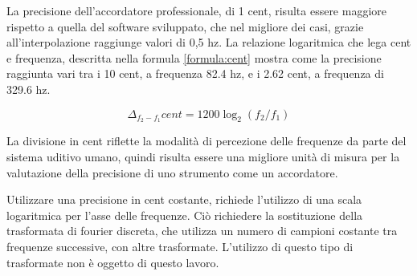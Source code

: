 La precisione dell'accordatore professionale, di 1 cent, risulta essere maggiore rispetto a quella del software sviluppato, che nel migliore dei casi, grazie all'interpolazione raggiunge valori di 0,5 hz.
La relazione logaritmica che lega cent e frequenza, descritta nella formula \ref{formula:cent} mostra come la precisione raggiunta vari tra i 10 cent, a frequenza 82.4 hz, e i 2.62 cent, a frequenza di 329.6 hz.

\begin{equation}\label{formula:cent}
		\Delta_{f_2-f_1} cent = 1200 \log_2 \left( f_2/f_1 \right)
	\end{equation} 

La divisione in cent riflette la modalità di percezione delle frequenze da parte del sistema uditivo umano, quindi risulta essere una migliore unità di misura per la valutazione della precisione di uno strumento come un accordatore.

Utilizzare una precisione in cent costante, richiede l'utilizzo di una scala logaritmica per l'asse delle frequenze.
Ciò richiedere la sostituzione della trasformata di fourier discreta, che utilizza un numero di campioni costante tra frequenze successive, con altre trasformate.
L'utilizzo di questo tipo di trasformate non è oggetto di questo lavoro.

 

